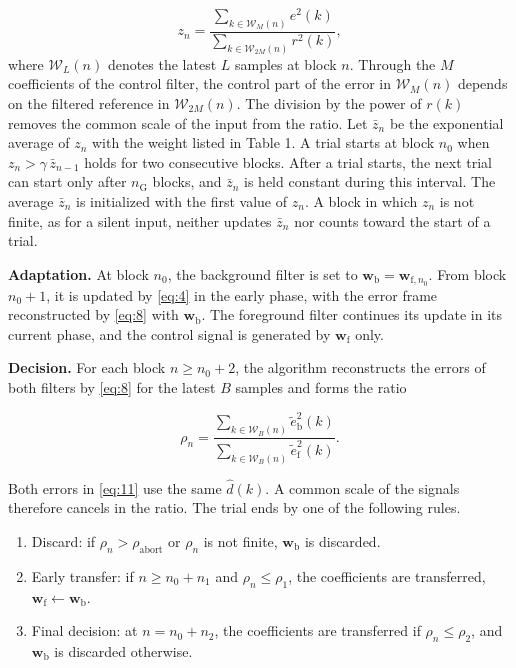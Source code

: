 \documentclass[sip,biber]{now-journal}
\providecommand{\tightlist}{\setlength{\itemsep}{0pt}\setlength{\parskip}{0pt}}
\begin{document}
\begin{equation}\label{eq:10}z_n = \frac{\sum_{k \in \mathcal{W}_M(n)} e^2(k)}{\sum_{k \in \mathcal{W}_{2M}(n)} r^2(k)},\end{equation} where \(\mathcal{W}_L(n)\) denotes the latest \(L\) samples at block \(n\). Through the \(M\) coefficients of the control filter, the control part of the error in \(\mathcal{W}_M(n)\) depends on the filtered reference in \(\mathcal{W}_{2M}(n)\). The division by the power of \(r(k)\) removes the common scale of the input from the ratio. Let \(\bar{z}_n\) be the exponential average of \(z_n\) with the weight listed in Table 1. A trial starts at block \(n_0\) when \(z_n > \gamma\,\bar{z}_{n-1}\) holds for two consecutive blocks. After a trial starts, the next trial can start only after \(n_{\mathrm G}\) blocks, and \(\bar{z}_n\) is held constant during this interval. The average \(\bar{z}_n\) is initialized with the first value of \(z_n\). A block in which \(z_n\) is not finite, as for a silent input, neither updates \(\bar{z}_n\) nor counts toward the start of a trial.

\textbf{Adaptation.} At block \(n_0\), the background filter is set to \(\mathbf{w}_{\mathrm b} = \mathbf{w}_{{\mathrm f}, n_0}\). From block \(n_0 + 1\), it is updated by \eqref{eq:4} in the early phase, with the error frame reconstructed by \eqref{eq:8} with \(\mathbf{w}_{\mathrm b}\). The foreground filter continues its update in its current phase, and the control signal is generated by \(\mathbf{w}_{\mathrm f}\) only.

\textbf{Decision.} For each block \(n \ge n_0 + 2\), the algorithm reconstructs the errors of both filters by \eqref{eq:8} for the latest \(B\) samples and forms the ratio

\begin{equation}\label{eq:11}\rho_n = \frac{\sum_{k \in \mathcal{W}_B(n)} \tilde{e}_{\mathrm b}^2(k)}{\sum_{k \in \mathcal{W}_B(n)} \tilde{e}_{\mathrm f}^2(k)}.\end{equation}

Both errors in \eqref{eq:11} use the same \(\hat{d}(k)\). A common scale of the signals therefore cancels in the ratio. The trial ends by one of the following rules.

\begin{enumerate}
\def\labelenumi{\arabic{enumi}.}
\tightlist
\item
  Discard: if \(\rho_n > \rho_{\mathrm{abort}}\) or \(\rho_n\) is not finite, \(\mathbf{w}_{\mathrm b}\) is discarded.
\item
  Early transfer: if \(n \ge n_0 + n_1\) and \(\rho_n \le \rho_1\), the coefficients are transferred, \(\mathbf{w}_{\mathrm f} \leftarrow \mathbf{w}_{\mathrm b}\).
\item
  Final decision: at \(n = n_0 + n_2\), the coefficients are transferred if \(\rho_n \le \rho_2\), and \(\mathbf{w}_{\mathrm b}\) is discarded otherwise.
\end{enumerate}
\end{document}
